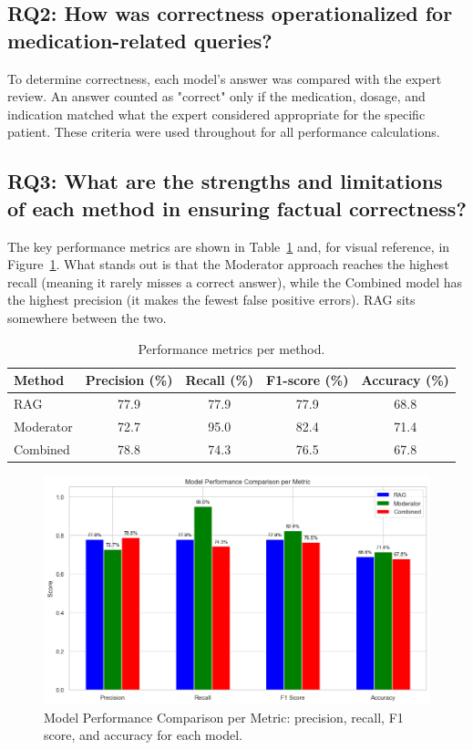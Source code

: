 \subsection{RQ2: How was correctness operationalized for medication-related queries?}

To determine correctness, each model's answer was compared with the expert review. An answer counted as "correct" only if the medication, dosage, and indication matched what the expert considered appropriate for the specific patient. These criteria were used throughout for all performance calculations.

\subsection{RQ3: What are the strengths and limitations of each method in ensuring factual correctness?}

The key performance metrics are shown in Table~\ref{tab:metrics} and, for visual reference, in Figure~\ref{fig:model_performance_comparison_per_metric}. What stands out is that the Moderator approach reaches the highest recall (meaning it rarely misses a correct answer), while the Combined model has the highest precision (it makes the fewest false positive errors). RAG sits somewhere between the two.

\begin{table}[H]
\centering
\caption{Performance metrics per method.}
\label{tab:metrics}
\begin{tabular}{lcccc}
\toprule
Method & Precision (\%) & Recall (\%) & F1-score (\%) & Accuracy (\%) \\
\midrule
RAG        & 77.9 & 77.9 & 77.9 & 68.8 \\
Moderator  & 72.7 & 95.0 & 82.4 & 71.4 \\
Combined   & 78.8 & 74.3 & 76.5 & 67.8 \\
\bottomrule
\end{tabular}
\end{table}

\begin{figure}[H]
  \centering
  \includegraphics[width=0.95\linewidth]{figures/model_performance comparison_per_metric.png}
  \caption{Model Performance Comparison per Metric: precision, recall, F1 score, and accuracy for each model.}
  \label{fig:model_performance_comparison_per_metric}
\end{figure}

